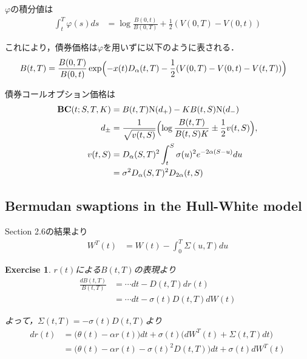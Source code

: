 \documentclass[11pt,a4paper]{jsarticle}
\newcommand{\BC}{\textbf{BC}}
\newtheorem{exercise}{Exercise}[section]
\begin{document}
$\varphi$の積分値は
\begin{align}
\int_t^T \varphi(s) ds
& =
\log \frac{B(0, t)}{B(0, T)} + \frac{1}{2} (V(0, T) - V(0, t)) \nonumber
\end{align}

これにより，債券価格は$\varphi$を用いずに以下のように表される．
\begin{align}
B(t, T)
& =
\frac{B(0, T)}{B(0, t)}
\exp \Bigl( -x(t) D_\alpha (t, T) - \frac{1}{2} (V(0, T) - V(0, t) - V(t, T)) \Bigr) \nonumber
\end{align}

債券コールオプション価格は
\begin{align}
\BC(t; S, T, K)
& =
B(t, T) \mathrm{N}(d_+) - K B(t, S) \mathrm{N}(d_-) \nonumber \\
d_\pm
& =
\frac{1}{\sqrt{v(t, S)}} \Bigl( \log \frac{B(t, T)}{B(t, S) K} \pm \frac{1}{2} v(t, S) \Bigr), \nonumber \\
v(t, S)
& =
D_\alpha (S, T)^2 \int_t^S \sigma(u)^2 e^{-2\alpha (S - u)} du \nonumber \\
& =
\sigma^2 D_\alpha (S, T)^2 D_{2\alpha} (t, S) \nonumber
\end{align}

\subsection{Bermudan swaptions in the Hull-White model}
Section 2.6の結果より
\begin{align}
W^T(t)
& =
W(t) - \int_0^T \Sigma(u, T) du \nonumber
\end{align}

\hrulefill
\begin{exercise}
$r(t)$による$B(t, T)$の表現より
\begin{align}
\frac{d B(t, T)}{B(t, T)}
& =
\cdots dt - D(t, T) d r(t) \nonumber \\
& =
\cdots dt - \sigma(t) D(t, T) d W(t) \nonumber
\end{align}

よって，$\Sigma(t, T) = -\sigma(t) D(t, T)$より
\begin{align}
d r(t)
& =
\bigl( \theta(t) - \alpha r(t) \bigr) dt + \sigma(t) \bigl( dW^T (t) + \Sigma(t, T) dt \bigr) \nonumber \\
& =
\bigl( \theta(t) - \alpha r(t) - \sigma (t)^2 D(t, T) \bigr) dt + \sigma(t) dW^T (t) \nonumber
\end{align}
\end{exercise}
\hrulefill \\
\end{document}
